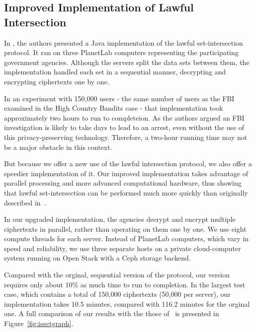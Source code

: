 \subsection{Improved Implementation of Lawful Intersection}\label{sec-isectimpl}

In \cite{sff-foci2014}, the authors presented a Java implementation of the 
lawful set-intersection protocol. It ran on three PlanetLab computers 
representing the participating government agencies. 
Although the servers split the data sets between them, the implementation 
handled each set in a sequential manner, decrypting and encrypting 
ciphertexts one by one.

In an experiment with 150,000 users - the same number of users as the FBI
examined in the High Country Bandits case - that implementation took
approximately two hours to run to completeion. As the authors argued an FBI
investigation is likely to take days to lead to an arrest, even without the
use of this privacy-preserving technology. Therefore, a two-hour running time
may not be a major obstacle in this context.

But because we offer a new use of the lawful intersection protocol, we
also offer a speedier implementation of it. Our improved implementation
takes advantage of parallel processing and more advanced computational 
hardware, thus showing that lawful set-intersection can be performed 
much more quickly than originally described in~\cite{sff-foci2014}. 



In our upgraded implementation, the agencies decrypt and encrypt 
multiple ciphertexts in parallel, rather than operating on them one by one. 
We use eight compute threads for each server. Instead of PlanetLab computers, 
which vary in speed and reliability, we use three separate hosts on a private 
cloud-computer system running on Open Stack with a Ceph storage backend.

Compared with the orginal, sequential version of the protocol, our version 
requires only about 10\% as much time to run to completion. In the 
largest test case, which contains a total of 
150,000 ciphertexts (50,000 per server), our implementation takes 10.5 minutes, 
compared with 116.2 minutes for the orginal one. A full comparison of our 
results with the those of~\cite{sff-foci2014} is presented in 
Figure~\ref{fig:isectgraph}.

